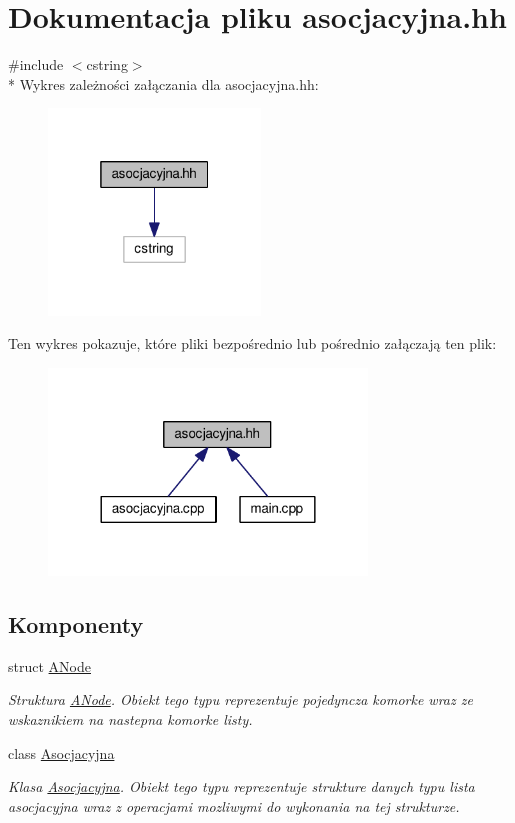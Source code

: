 \hypertarget{asocjacyjna_8hh}{\section{Dokumentacja pliku asocjacyjna.\-hh}
\label{asocjacyjna_8hh}
}
{\ttfamily \#include $<$cstring$>$}\\*
Wykres zależności załączania dla asocjacyjna.\-hh\-:\nopagebreak
\begin{figure}[H]
\begin{center}
\leavevmode
\includegraphics[width=160pt]{asocjacyjna_8hh__incl}
\end{center}
\end{figure}
Ten wykres pokazuje, które pliki bezpośrednio lub pośrednio załączają ten plik\-:\nopagebreak
\begin{figure}[H]
\begin{center}
\leavevmode
\includegraphics[width=240pt]{asocjacyjna_8hh__dep__incl}
\end{center}
\end{figure}
\subsection*{Komponenty}
\begin{DoxyCompactItemize}
\item 
struct \hyperlink{struct_a_node}{A\-Node}
\begin{DoxyCompactList}\small\item\em Struktura \hyperlink{struct_a_node}{A\-Node}. Obiekt tego typu reprezentuje pojedyncza komorke wraz ze wskaznikiem na nastepna komorke listy. \end{DoxyCompactList}\item 
class \hyperlink{class_asocjacyjna}{Asocjacyjna}
\begin{DoxyCompactList}\small\item\em Klasa \hyperlink{class_asocjacyjna}{Asocjacyjna}. Obiekt tego typu reprezentuje strukture danych typu lista asocjacyjna wraz z operacjami mozliwymi do wykonania na tej strukturze. \end{DoxyCompactList}\end{DoxyCompactItemize}
